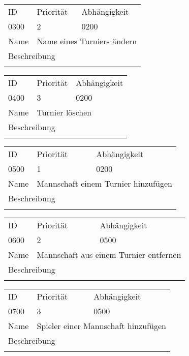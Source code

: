 	\begin{tabularx}{\textwidth}{|l|l|l|}
		ID & Priorität & Abhängigkeit \\
		0300 & 2 & 0200\\
		\hline
		Name & \multicolumn{2}{l}{Name eines Turniers ändern} \\
		\multicolumn{3}{l}{Beschreibung}\\
		\multicolumn{3}{l}{}\\
		\hline		 
	\end{tabularx}
	
	\begin{tabularx}{\textwidth}{|l|l|l|}
		ID & Priorität & Abhängigkeit \\
		0400 & 3 & 0200\\
		\hline
		Name & \multicolumn{2}{l}{Turnier löschen} \\
		\multicolumn{3}{l}{Beschreibung}\\
		\multicolumn{3}{l}{}\\
		\hline		 
	\end{tabularx}
	
	\begin{tabularx}{\textwidth}{|l|l|l|}
		ID & Priorität & Abhängigkeit \\
		0500 & 1 & 0200\\
		\hline
		Name & \multicolumn{2}{l}{Mannschaft einem Turnier hinzufügen} \\
		\multicolumn{3}{l}{Beschreibung}\\
		\multicolumn{3}{l}{}\\
		\hline		 
	\end{tabularx}
	
	\begin{tabularx}{\textwidth}{|l|l|l|}
		ID & Priorität & Abhängigkeit \\
		0600 & 2 & 0500\\
		\hline
		Name & \multicolumn{2}{l}{Mannschaft aus einem Turnier entfernen} \\
		\multicolumn{3}{l}{Beschreibung}\\
		\multicolumn{3}{l}{}\\
		\hline		 
	\end{tabularx}
	
	\begin{tabularx}{\textwidth}{|l|l|l|}
		ID & Priorität & Abhängigkeit \\
		0700 & 3 & 0500\\
		\hline
		Name & \multicolumn{2}{l}{Spieler einer Mannschaft hinzufügen} \\
		\multicolumn{3}{l}{Beschreibung}\\
		\multicolumn{3}{l}{}\\
		\hline		 
	\end{tabularx}
	
